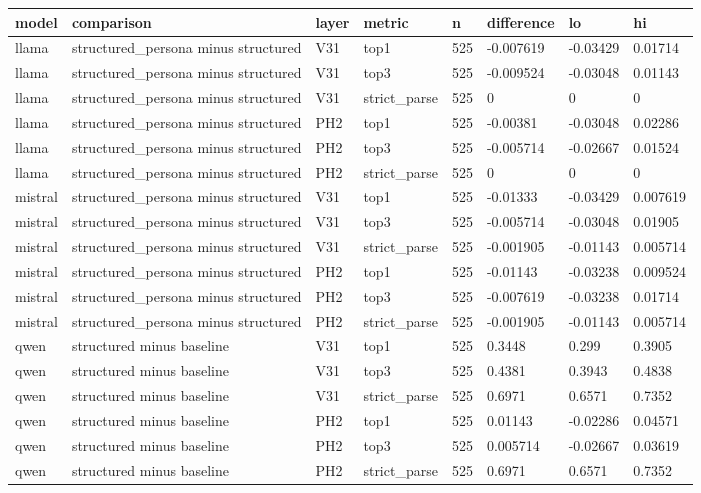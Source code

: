 \begin{tabular}{llllllll}
\toprule
model & comparison & layer & metric & n & difference & lo & hi \\
\midrule
llama & structured\_persona minus structured & V31 & top1 & 525 & -0.007619 & -0.03429 & 0.01714 \\
llama & structured\_persona minus structured & V31 & top3 & 525 & -0.009524 & -0.03048 & 0.01143 \\
llama & structured\_persona minus structured & V31 & strict\_parse & 525 & 0 & 0 & 0 \\
llama & structured\_persona minus structured & PH2 & top1 & 525 & -0.00381 & -0.03048 & 0.02286 \\
llama & structured\_persona minus structured & PH2 & top3 & 525 & -0.005714 & -0.02667 & 0.01524 \\
llama & structured\_persona minus structured & PH2 & strict\_parse & 525 & 0 & 0 & 0 \\
mistral & structured\_persona minus structured & V31 & top1 & 525 & -0.01333 & -0.03429 & 0.007619 \\
mistral & structured\_persona minus structured & V31 & top3 & 525 & -0.005714 & -0.03048 & 0.01905 \\
mistral & structured\_persona minus structured & V31 & strict\_parse & 525 & -0.001905 & -0.01143 & 0.005714 \\
mistral & structured\_persona minus structured & PH2 & top1 & 525 & -0.01143 & -0.03238 & 0.009524 \\
mistral & structured\_persona minus structured & PH2 & top3 & 525 & -0.007619 & -0.03238 & 0.01714 \\
mistral & structured\_persona minus structured & PH2 & strict\_parse & 525 & -0.001905 & -0.01143 & 0.005714 \\
qwen & structured minus baseline & V31 & top1 & 525 & 0.3448 & 0.299 & 0.3905 \\
qwen & structured minus baseline & V31 & top3 & 525 & 0.4381 & 0.3943 & 0.4838 \\
qwen & structured minus baseline & V31 & strict\_parse & 525 & 0.6971 & 0.6571 & 0.7352 \\
qwen & structured minus baseline & PH2 & top1 & 525 & 0.01143 & -0.02286 & 0.04571 \\
qwen & structured minus baseline & PH2 & top3 & 525 & 0.005714 & -0.02667 & 0.03619 \\
qwen & structured minus baseline & PH2 & strict\_parse & 525 & 0.6971 & 0.6571 & 0.7352 \\

\end{tabular}
